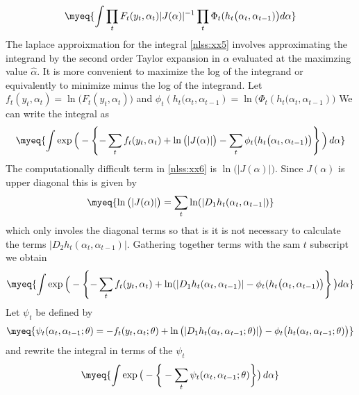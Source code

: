 \begin{equation}
 \myeq{
    \int \prod_t F_t(y_t,\alpha_t)
    |J(\alpha)|^{-1}\prod_t \Phi_t(h_t\big(\alpha_t,\alpha_{t-1})\big) d\alpha}\label{nlss:xx5}
\end{equation}
  The laplace approixmation for the integral \ref{nlss:xx5}
  involves approximating the integrand by the second order Taylor expansion 
  in $\alpha$ evaluated at the maximzing value $\widehat \alpha$.
    It is more convenient to maximize the log of the integrand or
   equivalently to minimize minus the log of the integrand.
    Let $f_t(y_t,\alpha_t)=\ln\big(F_t(y_t,\alpha_t)\big)$
    and $\phi_t(h_t\big(\alpha_t,\alpha_{t-1})=
            \ln\big(\Phi_t(h_t\big(\alpha_t,\alpha_{t-1})\big)$
We can write the integral as
\begin{equation}
 \myeq{
    \int \exp\Big( -\left\{-\sum_t f_t(y_t,\alpha_t)
    +\ln\big(|J(\alpha)|\big)
     -\sum_t \phi_t(h_t\big(\alpha_t,\alpha_{t-1})\big) \right\}\Big)
    \,d\alpha}
    \label{nlss:xx6}
\end{equation}
The computationally difficult term in \ref{nlss:xx6} is 
    $\ln\big(|J(\alpha)|\big)$.
Since $J(\alpha)$ is upper diagonal this is given by 
\begin{equation}
 \myeq{
    \ln\big(|J(\alpha)|\big)=\sum_t \ln(|D_1h_t(\alpha_t,\alpha_{t-1}|)}
    \label{nlss:xx7}
\end{equation}
which only involes the diagonal terms so that is it is not necessary to 
calculate the terms $|D_2h_t(\alpha_t,\alpha_{t-1})|$.
Gathering together terms with the sam $t$ subscript we obtain
\begin{equation}
 \myeq{
    \int \exp\Big( -\left\{-\sum_t f_t(y_t,\alpha_t)
     +\ln(|D_1h_t(\alpha_t,\alpha_{t-1})|
     -\phi_t(h_t\big(\alpha_t,\alpha_{t-1})\big) \right\}\big)d\alpha}
    \label{nlss:xx8}
\end{equation}
Let $\psi_t$ be defined by
\begin{equation}
 \myeq{
   \psi_t(\alpha_t,\alpha_{t-1};\theta)=-f_t(y_t,\alpha_t;\theta)
     +\ln\big (|D_1h_t(\alpha_t,\alpha_{t-1};\theta)|\big)
     -\phi_t\big (h_t(\alpha_t,\alpha_{t-1};\theta)\big)}
    \label{nlss:xx9}
\end{equation}
and rewrite the integral in terms of the $\psi_t$
\begin{equation}
 \myeq{
    \int 
      \exp\big( -\bigg\{-\sum_t \psi_t(\alpha_t,\alpha_{t-1};\theta)\bigg\}\big)
    \,d\alpha}
    \label{nlss:xx10}
\end{equation}
